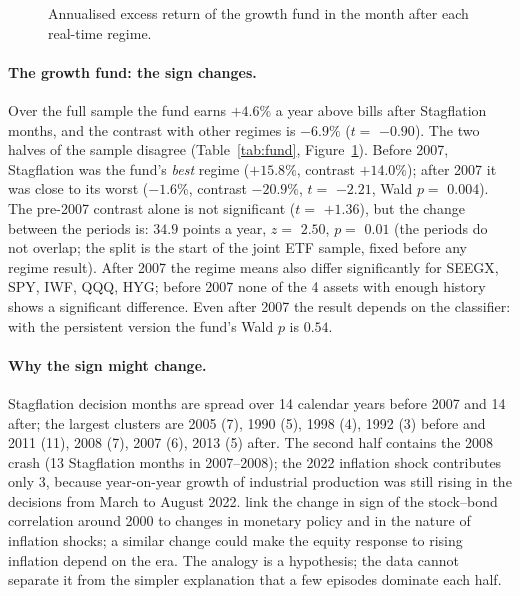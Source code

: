\documentclass[11pt,a4paper]{article}
\begin{document}
\begin{figure}[htbp]
\centering
{}
\caption{Annualised excess return of the growth fund in the month after each real-time regime.}
\label{fig:fund}
\end{figure}

\paragraph{The growth fund: the sign changes.} Over the full sample the fund earns $+4.6\%$ a year above bills
after Stagflation months, and the contrast with other regimes is $-6.9\%$ ($t=$ $-0.90$). The two halves of
the sample disagree (Table~\ref{tab:fund}, Figure~\ref{fig:fund}). Before 2007, Stagflation was the fund's
\emph{best} regime ($+15.8\%$, contrast $+14.0\%$); after 2007 it was close to its worst ($-1.6\%$,
contrast $-20.9\%$, $t=$ $-2.21$, Wald $p=$ $0.004$). The pre-2007 contrast alone is not significant
($t=$ $+1.36$), but the change between the periods is: $34.9$ points a year, $z=$ $2.50$, $p=$ $0.01$
(the periods do not overlap; the split is the start of the joint ETF sample, fixed before any regime result). After 2007 the regime means also differ
significantly for SEEGX, SPY, IWF, QQQ, HYG; before 2007 none of the 4 assets with enough history shows a
significant difference. Even after 2007 the result depends on the classifier: with the persistent version the
fund's Wald $p$ is $0.54$.

\paragraph{Why the sign might change.} Stagflation decision months are spread over 14 calendar
years before 2007 and 14 after; the largest clusters are 2005 (7), 1990 (5), 1998 (4), 1992 (3) before and
2011 (11), 2008 (7), 2007 (6), 2013 (5) after. The second half contains the 2008 crash (13 Stagflation months in
2007--2008); the 2022 inflation shock contributes only 3, because year-on-year growth of industrial
production was still rising in the decisions from March to August 2022. \citet{campbell2020} link the change in
sign of the stock--bond correlation around 2000 to changes in monetary policy and in the nature of inflation
shocks; a similar change could make the equity response to rising inflation depend on the era. The analogy is a hypothesis; the data cannot separate it from the simpler explanation that a few episodes dominate each half.
\end{document}
